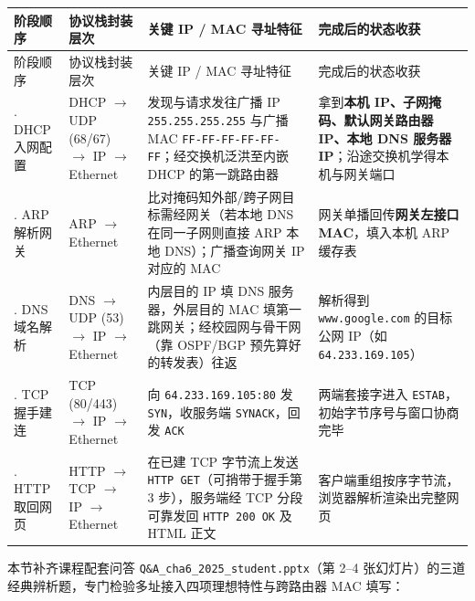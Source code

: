 \begingroup\small\setlength{\tabcolsep}{3pt}\renewcommand{\arraystretch}{1.22}
\begin{longtable}{@{}>{\raggedright\arraybackslash}p{}>{\raggedright\arraybackslash}p{}>{\raggedright\arraybackslash}p{}>{\raggedright\arraybackslash}p{}@{}}
\toprule
阶段顺序 & 协议栈封装层次 & 关键 IP / MAC 寻址特征 & 完成后的状态收获 \\
\midrule\endfirsthead
阶段顺序 & 协议栈封装层次 & 关键 IP / MAC 寻址特征 & 完成后的状态收获 \\
\midrule\endhead
\bottomrule\endfoot
1. DHCP 入网配置 & DHCP $\to$ UDP (68/67) $\to$ IP $\to$ Ethernet & 发现与请求发往广播 IP \texttt{255.255.255.255} 与广播 MAC \texttt{FF-FF-FF-FF-FF-FF}；经交换机泛洪至内嵌 DHCP 的第一跳路由器 & 拿到\textbf{本机 IP、子网掩码、默认网关路由器 IP、本地 DNS 服务器 IP}；沿途交换机学得本机与网关端口 \\
2. ARP 解析网关 & ARP $\to$ Ethernet & 比对掩码知外部/跨子网目标需经网关（若本地 DNS 在同一子网则直接 ARP 本地 DNS）；广播查询网关 IP 对应的 MAC & 网关单播回传\textbf{网关左接口 MAC}，填入本机 ARP 缓存表 \\
3. DNS 域名解析 & DNS $\to$ UDP (53) $\to$ IP $\to$ Ethernet & 内层目的 IP 填 DNS 服务器，外层目的 MAC 填第一跳网关；经校园网与骨干网（靠 OSPF/BGP 预先算好的转发表）往返 & 解析得到 \texttt{www.google.com} 的目标公网 IP（如 \texttt{64.233.169.105}） \\
4. TCP 握手建连 & TCP (80/443) $\to$ IP $\to$ Ethernet & 向 \texttt{64.233.169.105:80} 发 \texttt{SYN}，收服务端 \texttt{SYNACK}，回发 \texttt{ACK} & 两端套接字进入 \texttt{ESTAB}，初始字节序号与窗口协商完毕 \\
5. HTTP 取回网页 & HTTP $\to$ TCP $\to$ IP $\to$ Ethernet & 在已建 TCP 字节流上发送 \texttt{HTTP GET}（可捎带于握手第 3 步），服务端经 TCP 分段可靠发回 \texttt{HTTP 200 OK} 及 HTML 正文 & 客户端重组按序字节流，浏览器解析渲染出完整网页 \\
\end{longtable}\endgroup



本节补齐课程配套问答 \texttt{Q\&A\_cha6\_2025\_student.pptx}（第 2–4 张幻灯片）的三道经典辨析题，专门检验多址接入四项理想特性与跨路由器 MAC 填写：

